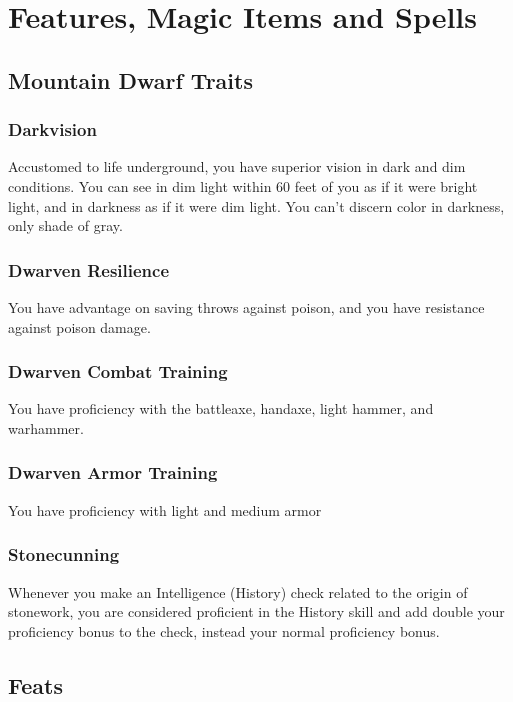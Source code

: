 \documentclass[letterpaper,openany,oneside,twocolumn]{book}
\begin{document}
\onecolumn


\rendercharactersheet

\renderbackgroundsheet

\renderspellsheet

\restoregeometry
\twocolumn

\chapter*{Features, Magic Items and Spells}

\section*{Mountain Dwarf Traits}
\subsection*{Darkvision}
Accustomed to life underground, you have superior vision in dark and dim conditions. You can see in dim light within 60 feet of you as if it were bright light, and in darkness as if it were dim light. You can't discern color in darkness, only shade of gray.
\subsection*{Dwarven Resilience}
You have advantage on saving throws against poison, and you have resistance against poison damage.
\subsection*{Dwarven Combat Training}
You have proficiency with the battleaxe, handaxe, light hammer, and warhammer.
\subsection*{Dwarven Armor Training}
You have proficiency with light and medium armor
\subsection*{Stonecunning}
Whenever you make an Intelligence (History) check related to the origin of stonework, you are considered proficient in the History skill and add double your proficiency bonus to the check, instead your normal proficiency bonus.

\section*{Feats}
\end{document}
